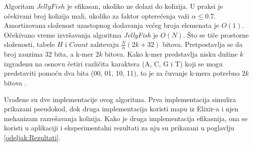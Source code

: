 \documentclass[12pt,oneside]{memoir}
\begin{document}
\begin{comment}

\begin{figure}[!ht]
  \centering
  \texttt{[image: 58\_3algoritma.PNG]}
  \caption{Razmatra se skup 4-mera $Z = \{AC; CG; AC; GT; CA; GG; AC; GT\}$: (a) Ilustruje jednostavan metod za brojanje k-mera koji koristi tabelu \textit{Count} veličine 4k. (b) Ilustruje \textit{JellyFish} metod brojanja k-mera koja koristi heš tabelu veličine 7. Heš funkcija je $h(z) = b(z)$ \textit{mod} $7$. Na primer, $GT$ se čuva u tabeli $Count$ sa indeksom 4, jer je $h(GT) = 4$. U ovom primeru se javlja jedna kolizija. Pošto je i $h(CA) = 4$, $CA$ je u koliziji sa $GT$. Linearnim isprobavanjem $CA$ se ipak čuva u tabeli $Count$ sa indeksom 5. (c) Ilustruje DSK metod brojanja k-mera.
Pretpostavka je da je $h(z) = b(z)$, $n_{list} = 2$ i $n_{sublist} = 2$. DSK deli Z u
4 ($= n_{list} * n_{sublist}$) podliste, a zatim pokreće \textit{JellyFish} algoritam za brojanje k-mera u svakoj podlisti.}
  \label{fig:5}
  \source{\cite{WingKinSung}}
\end{figure}

Slika \ref{fig:5}(b) daje primer koji ilustruje algoritam $JellyFish$. 
\end{comment}

Algoritam $JellyFish$ je efikasan, ukoliko ne dolazi do kolizija. U praksi je očekivani broj kolizija mali, ukoliko za faktor opterećenja važi $\alpha \leq 0.7$. Amortizovana složenost uzastopnog dodavanja većeg broja elemenata je $O(1)$. Očekivano vreme izvršavanja algoritma \textit{JellyFish} je $O(N)$. Što se tiče prostorne složenosti, tabele $H$ i $Count$ zahtevaju $\frac{N}{\alpha}(2k + 32)$ bitova. Pretpostavlja se da broj zauzima 32 bita, a k-mer $2k$ bitova. Kako k-mer predstavlja nisku dužine $k$ izgrađenu na osnovu četiri različita karaktera (A, C, G i T) koji se mogu predstaviti pomoću dva bita (00, 01, 10, 11), to je za čuvanje k-mera potrebno $2k$ bitova \cite{WingKinSung}.

Urađene su  dve implementacije ovog algoritma. Prva implementacija simulira prikazani pseudokod, dok druga implementacija koristi mapu iz Elixir-a i njen mehanizam razrešavanja kolizija. Kako je druga implementacija efikasnija, ona se koristi u aplikaciji i eksperimentalni rezultati za nju su prikazani u poglavlju \ref{odeljak:Rezultati}. 
\end{document}
